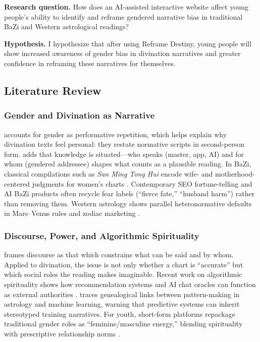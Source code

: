 \documentclass[stu,12pt,floatsintext]{apa7}
\begin{document}
\textbf{Research question.} How does an AI-assisted interactive website affect young people's ability to identify and reframe gendered narrative bias in traditional BaZi and Western astrological readings?

\textbf{Hypothesis.} I hypothesize that after using Reframe Destiny, young people will show increased awareness of gender bias in divination narratives and greater confidence in reframing these narratives for themselves.

\subsection{Literature Review}

\subsubsection{Gender and Divination as Narrative}

\textcite{butler1990} accounts for gender as performative repetition, which helps explain why divination texts feel personal: they restate normative scripts in second-person form. \textcite{haraway1988} adds that knowledge is situated---who speaks (master, app, AI) and for whom (gendered addressee) shapes what counts as a plausible reading. In BaZi, classical compilations such as \textit{San Ming Tong Hui} encode wife- and motherhood-centered judgments for women's charts \parencite{ctext_sanming}. Contemporary SEO fortune-telling and AI BaZi products often recycle fear labels (``fierce fate,'' ``husband harm'') rather than removing them. Western astrology shows parallel heteronormative defaults in Mars--Venus rules and zodiac marketing \parencite{thisisgendered_zodiac}.

\subsubsection{Discourse, Power, and Algorithmic Spirituality}

\textcite{foucault1972} frames discourse as that which constrains what can be said and by whom. Applied to divination, the issue is not only whether a chart is ``accurate'' but which social roles the reading makes imaginable. Recent work on algorithmic spirituality shows how recommendation systems and AI chat oracles can function as external authorities \parencite{cotter2022,cearns2024}. \textcite{nikolic2023} traces genealogical links between pattern-making in astrology and machine learning, warning that predictive systems can inherit stereotyped training narratives. For youth, short-form platforms repackage traditional gender roles as ``feminine/masculine energy,'' blending spirituality with prescriptive relationship norms \parencite{teenVogue2022}.
\end{document}
